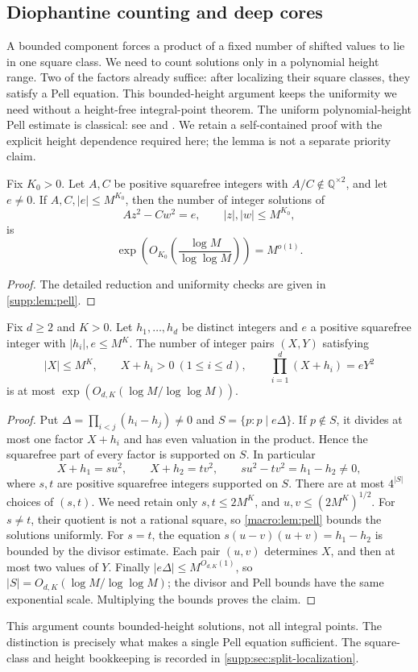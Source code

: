 \subsection{Diophantine counting and deep cores}
A bounded component forces a product of a fixed number of shifted values
to lie in one square class. We need to count solutions only in a polynomial
height range. Two of the factors already suffice: after localizing their
square classes, they satisfy a Pell equation. This bounded-height argument
keeps the uniformity we need without a height-free integral-point theorem.
The uniform polynomial-height Pell estimate is classical: see
\cite[arXiv text, Lemma~4]{CillerueloGaraev2011} and
\cite[Lemma~2.10 and Remark~2.12]{Tao2026}.
We retain a self-contained proof with the explicit height dependence
required here; the lemma is not a separate priority claim.
\begin{lemma}\label{macro:lem:pell}
Fix $K_0>0$.  Let $A,C$ be positive squarefree integers with
$A/C\notin\mathbb Q^{\times2}$, and let $e\neq0$.  If
$A,C,|e|\leq M^{K_0}$, then the number of integer solutions of
\[
 Az^2-Cw^2=e,
 \qquad |z|,|w|\leq M^{K_0},
\]
is
\[
 \exp\!\left(O_{K_0}\!\left(\frac{\log M}{\log\log M}\right)\right)
 =M^{o(1)}.
\]
\end{lemma}

\begin{proof}The detailed reduction and uniformity checks are given in \cref{supp:lem:pell}.\end{proof}
\begin{lemma}\label{lem:split-bounded}
Fix $d\ge2$ and $K>0$. Let $h_1,\ldots,h_d$ be distinct integers and
$e$ a positive squarefree integer with $|h_i|,e\le M^K$.
The number of integer pairs $(X,Y)$ satisfying
\[
 |X|\le M^K,\qquad X+h_i>0\ (1\le i\le d),\qquad
              \prod_{i=1}^d(X+h_i)=eY^2
\]
is at most $\exp(O_{d,K}(\log M/\log\log M))$.
\end{lemma}
\begin{proof}
Put $\Delta=\prod_{i<j}(h_i-h_j)\ne0$ and
$S=\{p:p\mid e\Delta\}$. If $p\notin S$, it divides at most one
factor $X+h_i$ and has even valuation in the product. Hence the
squarefree part of every factor is supported on $S$.
In particular
\[
 X+h_1=su^2,\qquad X+h_2=tv^2,
 \qquad su^2-tv^2=h_1-h_2\ne0,
\]
where $s,t$ are positive squarefree integers supported on $S$.
There are at most $4^{|S|}$ choices of $(s,t)$. We need retain only
$s,t\le2M^K$, and $u,v\le(2M^K)^{1/2}$.
For $s\ne t$, their quotient is not a rational square, so
\cref{macro:lem:pell} bounds the solutions uniformly. For $s=t$,
the equation $s(u-v)(u+v)=h_1-h_2$ is bounded by the divisor estimate.
Each pair $(u,v)$ determines $X$, and then at most two values of $Y$.
Finally $|e\Delta|\le M^{O_{d,K}(1)}$, so
$|S|=O_{d,K}(\log M/\log\log M)$; the divisor and Pell bounds have the
same exponential scale. Multiplying the bounds proves the claim.
\end{proof}
This argument counts bounded-height solutions, not all integral points.
The distinction is precisely what makes a single Pell equation sufficient.
The square-class and height bookkeeping is recorded in
\cref{supp:sec:split-localization}.

